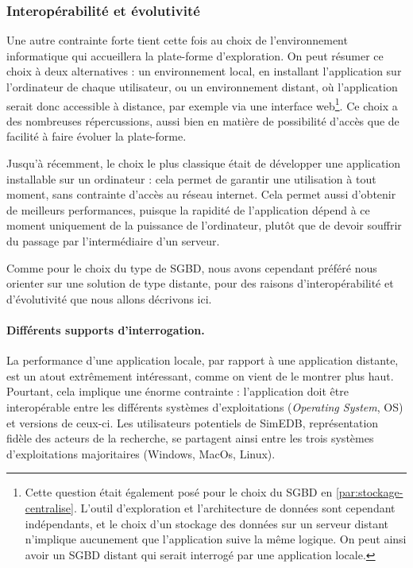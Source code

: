 \subsubsection{Interopérabilité et évolutivité}

Une autre contrainte forte tient cette fois au choix de l'environnement informatique qui accueillera la plate-forme d'exploration.
On peut résumer ce choix à deux alternatives : un environnement local, en installant l'application sur l'ordinateur de chaque utilisateur, ou un environnement distant, où l'application serait donc accessible à distance, par exemple via une interface web\footnote{
	Cette question était également posé pour le choix du SGBD en \cref{par:stockage-centralise}.
	L'outil d'exploration et l'architecture de données sont cependant indépendants, et le choix d'un stockage des données sur un serveur distant n'implique aucunement que l'application suive la même logique.
	On peut ainsi avoir un SGBD distant qui serait interrogé par une application locale.
}.
Ce choix a des nombreuses répercussions, aussi bien en matière de possibilité d'accès que de facilité à faire évoluer la plate-forme.

Jusqu'à récemment, le choix le plus classique était de développer une application installable sur un ordinateur : cela permet de garantir une utilisation à tout moment, sans contrainte d'accès au réseau internet.
Cela permet aussi d'obtenir de meilleurs performances, puisque la rapidité de l'application dépend à ce moment uniquement de la puissance de l'ordinateur, plutôt que de devoir souffrir du passage par l'intermédiaire d'un serveur.

Comme pour le choix du type de SGBD, nous avons cependant préféré nous orienter sur une solution de type distante, pour des raisons d'interopérabilité et d'évolutivité que nous allons décrivons ici.


\paragraph{Différents supports d'interrogation.}
La performance d'une application locale, par rapport à une application distante, est un atout extrêmement intéressant, comme on vient de le montrer plus haut.
Pourtant, cela implique une énorme contrainte : l'application doit être interopérable entre les différents systèmes d'exploitations (\textit{Operating System}, OS) et versions de ceux-ci.
Les utilisateurs potentiels de SimEDB, représentation fidèle des acteurs de la recherche, se partagent ainsi entre les trois systèmes d'exploitations majoritaires (Windows, MacOs, Linux).

